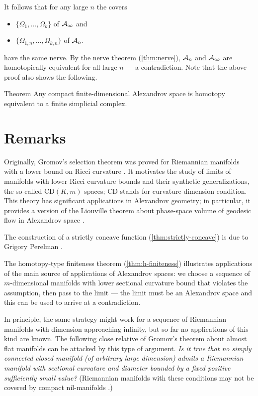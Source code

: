It follows that for any large $n$ the covers 
\begin{itemize}
\item $\{\Omega_{1},\dots,\Omega_{k}\}$ of $\mathcal{A}_\infty$ and 
\item $\{\Omega_{1,n},\dots,\Omega_{k,n}\}$ of $\mathcal{A}_n$.
\end{itemize}
have the same nerve.
By the nerve theorem (\ref{thm:nerve}), $\mathcal{A}_n$ and $\mathcal{A}_\infty$ are homotopically equivalent for all large $n$ --- a contradiction.
\qeds
Note that the above proof also shows the following.

\begin{thm}{Theorem}\label{thm:finite-dim-hom-simplicial}
Any compact finite-dimensional Alexandrov space is homotopy equivalent to a finite simplicial complex.
\end{thm}

\section{Remarks}

Originally, Gromov's selection theorem was proved for Riemannian manifolds with a lower bound on Ricci curvature \cite{gromov1981}.
It motivates the study of limits of manifolds with lower Ricci curvature bounds and their synthetic generalizations, the so-called $\mathrm{CD}(K,m)$ spaces; $\mathrm{CD}$ stands for curvature-dimension condition.
This theory has significant applications in Alexandrov geometry;
in particular, it provides a version of the Liouville theorem about phase-space volume of geodesic flow in Alexandrov space \cite{brue-mondino-semola}.

The construction of a strictly concave function (\ref{thm:strictly-concave}) is due to Grigory Perelman \cite{perelman1993,perelman-petrunin}.

The homotopy-type finiteness theorem (\ref{thm:h-finiteness}) illustrates applications of the main source of applications of Alexandrov spaces:
we choose a sequence of $m$-dimensional manifolds with lower sectional curvature bound that violates the assumption, 
then pass to the limit --- the limit must be an Alexandrov space and this can be used to arrive at a contradiction.

In principle, the same strategy might work for a sequence of Riemannian manifolds with dimension approaching infinity, but so far no applications of this kind are known.
The following close relative of Gromov's theorem about almost flat manifolds can be attacked by this type of argument.
\textit{Is it true that no simply connected closed manifold (of arbitrary large dimension) admits a Riemannian manifold with sectional curvature and diameter bounded by a fixed positive sufficiently small value?}
(Riemannian manifolds with these conditions may not be covered by compact nil-manifolds \cite{guzhvina2008}.)

